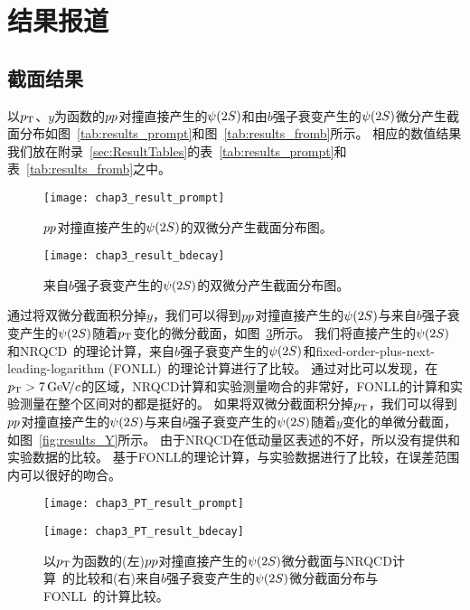 \section{结果报道}
\subsection{截面结果}
以$\mbox{$p_{\mathrm{ T}}$}$、$y$为函数的${pp}$对撞直接产生的${\psi{(2S)}}$和由$b$强子衰变产生的${\psi{(2S)}}$微分产生截面分布如图~\ref{tab:results_prompt}和图~\ref{tab:results_fromb}所示。
相应的数值结果我们放在附录~\ref{sec:ResultTables}的表~\ref{tab:results_prompt}和表~\ref{tab:results_fromb}之中。
\begin{figure}[!tbp]
\centering
\texttt{[image: chap3\_result\_prompt]}
\caption{${pp}$对撞直接产生的${\psi{(2S)}}$的双微分产生截面分布图。}
\label{fig:results_prompt}
\end{figure}
\begin{figure}[!tbp]
\centering
\texttt{[image: chap3\_result\_bdecay]}
\caption{来自$b$强子衰变产生的${\psi{(2S)}}$的双微分产生截面分布图。}
\label{fig:results_fromb}
\end{figure}

通过将双微分截面积分掉$y$，我们可以得到${pp}$对撞直接产生的${\psi{(2S)}}$与来自$b$强子衰变产生的${\psi{(2S)}}$随着$\mbox{$p_{\mathrm{ T}}$}$变化的微分截面，如图~\ref{fig:results_PT}所示。
我们将直接产生的${\psi{(2S)}}$和NRQCD~\cite{Shao:2014yta}的理论计算，来自$b$强子衰变产生的${\psi{(2S)}}$和fixed-order-plus-next-leading-logarithm (FONLL)~\cite{Cacciari:1998it}的理论计算进行了比较。
通过对比可以发现，在$\mbox{$p_{\mathrm{ T}}$}>7{\mathrm{\,Ge\kern -0.1em V\!/}c}$的区域，NRQCD计算和实验测量吻合的非常好，FONLL的计算和实验测量在整个区间对的都是挺好的。
如果将双微分截面积分掉$\mbox{$p_{\mathrm{ T}}$}$，我们可以得到${pp}$对撞直接产生的${\psi{(2S)}}$与来自$b$强子衰变产生的${\psi{(2S)}}$随着$y$变化的单微分截面，如图~\ref{fig:results_Y}所示。
由于NRQCD在低动量区表述的不好，所以没有提供和实验数据的比较。
基于FONLL的理论计算，与实验数据进行了比较，在误差范围内可以很好的吻合。


\begin{figure}[!tbp]
\centering
\begin{minipage}[t]{0.49\textwidth}
\centering
\texttt{[image: chap3\_PT\_result\_prompt]}
\end{minipage}
\begin{minipage}[t]{0.49\textwidth}
\centering
\texttt{[image: chap3\_PT\_result\_bdecay]}
\end{minipage}
\caption{以$\mbox{$p_{\mathrm{ T}}$}$为函数的(左)${pp}$对撞直接产生的${\psi{(2S)}}$微分截面与NRQCD计算~\cite{Shao:2014yta}的比较和(右)来自$b$强子衰变产生的${\psi{(2S)}}$微分截面分布与FONLL~\cite{Cacciari:1998it}的计算比较。}
\label{fig:results_PT}
\end{figure}

